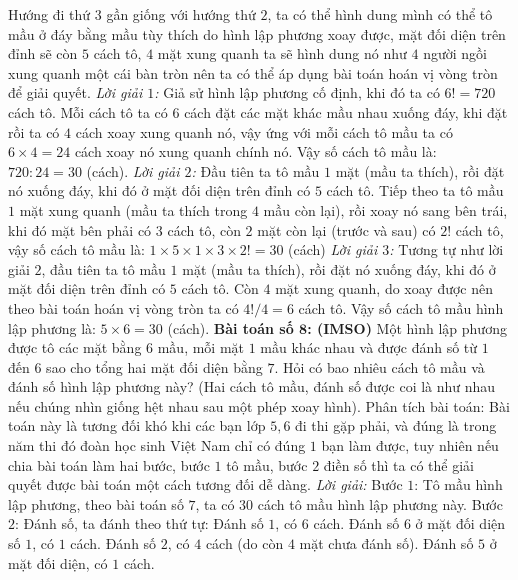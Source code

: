 \begin{multicols}{2}
	\vskip 0.1cm
	Hướng đi thứ $3$ gần giống với hướng thứ $2$, ta có thể hình dung mình có thể tô mầu ở đáy bằng mầu tùy thích do hình lập phương xoay được, mặt đối diện trên đỉnh sẽ còn $5$ cách tô, $4$ mặt xung quanh ta sẽ hình dung nó như $4$ người ngồi xung quanh một cái bàn tròn nên ta có thể áp dụng bài toán hoán vị vòng tròn để giải quyết.
	\vskip 0.1cm
	\textit{Lời giải $1$:}
	\vskip 0.1cm 
	Giả sử hình lập phương cố định, khi đó ta có $6!=720$ cách tô.
	\vskip 0.1cm
	Mỗi cách tô ta có $6$ cách đặt các mặt khác mầu nhau xuống đáy, khi đặt rồi ta có $4$ cách xoay xung quanh nó, vậy ứng với mỗi cách tô mầu ta có $6\times4=24$ cách xoay nó xung quanh chính nó. Vậy số cách tô mầu là: $720:24=30$ (cách).
	\vskip 0.1cm
	\textit{Lời giải $2$:}
	\vskip 0.1cm 
	Đầu tiên ta tô mầu $1$ mặt (mầu ta thích), rồi đặt nó xuống đáy, khi đó ở mặt đối diện trên đỉnh có $5$ cách tô.
	\vskip 0.1cm
	Tiếp theo ta tô mầu $1$ mặt xung quanh (mầu ta thích trong $4$ mầu còn lại), rồi xoay nó sang bên trái, khi đó mặt bên phải có $3$ cách tô, còn $2$ mặt còn lại (trước và sau) có $2!$ cách tô, vậy số cách tô mầu là: $1\times5\times1\times3\times2!=30$ (cách)
	\vskip 0.1cm
	\textit{Lời giải $3$:}
	\vskip 0.1cm
	Tương tự như lời giải $2$, đầu tiên ta tô mầu $1$ mặt (mầu ta thích), rồi đặt nó xuống đáy, khi đó ở mặt đối diện trên đỉnh có $5$ cách tô.
	\vskip 0.1cm
	Còn $4$ mặt xung quanh, do xoay được nên theo bài toán hoán vị vòng tròn ta có $4!/4=6$ cách tô.
	\vskip 0.1cm
	Vậy số cách tô mầu hình lập phương là: $5\times 6=30$ (cách).
	\vskip 0.1cm
	\textbf{\color{toancuabi}Bài toán số $\pmb{8}$: (IMSO)}
	\vskip 0.1cm
	Một hình lập phương được tô các mặt bằng $6$ mầu, mỗi mặt $1$ mầu khác nhau và được đánh số từ $1$ đến $6$ sao cho tổng hai mặt đối diện bằng $7$. Hỏi có bao nhiêu cách tô mầu và đánh số hình lập phương này? (Hai cách tô mầu, đánh số được coi là như nhau nếu chúng nhìn giống hệt nhau sau một phép xoay hình). 
	\vskip 0.1cm
	Phân tích bài toán: Bài toán này là tương đối khó khi các bạn lớp $5,6$ đi thi gặp phải, và đúng là trong năm thi đó đoàn học sinh Việt Nam chỉ có đúng $1$ bạn làm được, tuy nhiên nếu chia bài toán làm hai bước, bước $1$ tô mầu, bước $2$ điền số thì ta có thể giải quyết được bài toán một cách tương đối dễ dàng.
	\vskip 0.1cm
	\textit{Lời giải:}
	\vskip 0.1cm 
	Bước $1$: Tô mầu hình lập phương, theo bài toán số $7$, ta có $30$ cách tô mầu hình lập phương này.
	\vskip 0.1cm
	Bước $2$: Đánh số, ta đánh theo thứ tự:
	\vskip 0.1cm
	Đánh số $1$, có $6$ cách. Đánh số $6$ ở mặt đối diện số $1$, có $1$ cách.
	\vskip 0.1cm
	Đánh số $2$, có $4$ cách (do còn $4$ mặt chưa đánh số). Đánh số $5$ ở mặt đối diện, có $1$ cách.

\end{multicols}

